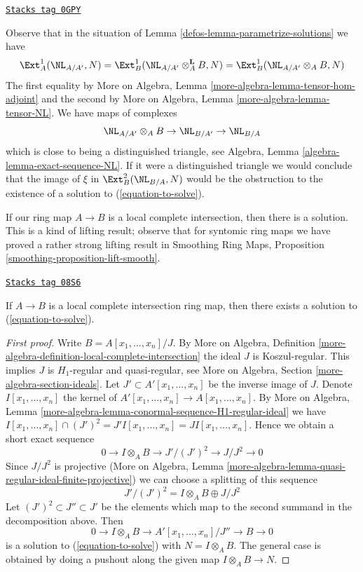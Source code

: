 \begin{remark}
\label{defos-remark-parametrize-solutions}
\href{https://stacks.math.columbia.edu/tag/0GPY}{\texttt{Stacks tag 0GPY}}

Observe that in the situation of Lemma \ref{defos-lemma-parametrize-solutions}
we have
$$
\Ext^1_A(\NL_{A/A'}, N) =
\Ext^1_B(\NL_{A/A'} \otimes_A^\mathbf{L} B, N) =
\Ext^1_B(\NL_{A/A'} \otimes_A B, N)
$$
The first equality by
More on Algebra, Lemma \ref{more-algebra-lemma-tensor-hom-adjoint} and
the second by
More on Algebra, Lemma \ref{more-algebra-lemma-tensor-NL}.
We have maps of complexes
$$
\NL_{A/A'} \otimes_A B \to \NL_{B/A'} \to \NL_{B/A}
$$
which is close to being a distinguished triangle, see
Algebra, Lemma \ref{algebra-lemma-exact-sequence-NL}.
If it were a distinguished triangle we would conclude
that the image of $\xi$ in $\Ext^2_B(\NL_{B/A}, N)$
would be the obstruction to the existence of a solution to
(\ref{equation-to-solve}).
\end{remark}

If our ring map $A \to B$ is a local complete intersection, then there
is a solution. This is a kind of lifting result; observe that
for syntomic ring maps we have proved a rather strong lifting result in
Smoothing Ring Maps, Proposition \ref{smoothing-proposition-lift-smooth}.

\begin{lemma}
\label{defos-lemma-existence-lci}
\href{https://stacks.math.columbia.edu/tag/08S6}{\texttt{Stacks tag 08S6}}

If $A \to B$ is a local complete intersection ring map, then
there exists a solution to (\ref{equation-to-solve}).
\end{lemma}

\begin{proof}[First proof]
Write $B = A[x_1, \ldots, x_n]/J$. By More on Algebra, Definition
\ref{more-algebra-definition-local-complete-intersection}
the ideal $J$ is Koszul-regular. This implies $J$ is $H_1$-regular and
quasi-regular, see More on Algebra, Section \ref{more-algebra-section-ideals}.
Let $J' \subset A'[x_1, \ldots, x_n]$
be the inverse image of $J$. Denote $I[x_1, \ldots, x_n]$ the
kernel of $A'[x_1, \ldots, x_n] \to A[x_1, \ldots, x_n]$.
By More on Algebra, Lemma
\ref{more-algebra-lemma-conormal-sequence-H1-regular-ideal} we have
$I[x_1, \ldots, x_n] \cap (J')^2 = J'I[x_1, \ldots, x_n] =
JI[x_1, \ldots, x_n]$. Hence we obtain a short exact sequence
$$
0 \to I \otimes_A B \to J'/(J')^2 \to J/J^2 \to 0
$$
Since $J/J^2$ is projective (More on Algebra, Lemma
\ref{more-algebra-lemma-quasi-regular-ideal-finite-projective})
we can choose a splitting of this sequence
$$
J'/(J')^2 = I \otimes_A B \oplus J/J^2
$$
Let $(J')^2 \subset J'' \subset J'$ be the elements which map to the
second summand in the decomposition above. Then
$$
0 \to I \otimes_A B \to A'[x_1, \ldots, x_n]/J'' \to B \to 0
$$
is a solution to (\ref{equation-to-solve}) with $N = I \otimes_A B$.
The general case is obtained by doing a pushout along the given
map $I \otimes_A B \to N$.
\end{proof}

